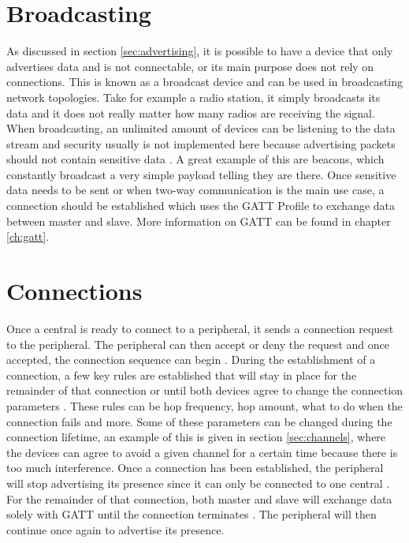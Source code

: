 \documentclass[pdftex,a4paper,12pt,twoside]{report}
\begin{document}
\section{Broadcasting}
\label{sec:broadcasting}
As discussed in section \ref{sec:advertising}, it is possible to have a device that only advertises data and is not connectable, or its main purpose does not rely on connections. This is known as a broadcast device and can be used in broadcasting network topologies. Take for example a radio station, it simply broadcasts its data and it does not really matter how many radios are receiving the signal. When broadcasting, an unlimited amount of devices can be listening to the data stream and security usually is not implemented here because advertising packets should not contain sensitive data \citep{heydon2012bluetooth}. A great example of this are beacons, which constantly broadcast a very simple payload telling they are there. Once sensitive data needs to be sent or when two-way communication is the main use case, a connection should be established which uses the GATT Profile to exchange data between master and slave. More information on GATT can be found in chapter \ref{ch:gatt}.

\section{Connections}
\label{sec:connections}
Once a central is ready to connect to a peripheral, it sends a connection request to the peripheral. The peripheral can then accept or deny the request and once accepted, the connection sequence can begin \citep{heydon2012bluetooth}. During the establishment of a connection, a few key rules are established that will stay in place for the remainder of that connection or until both devices agree to change the connection parameters \citep{bluetooth2014bluetooth}. These rules can be hop frequency, hop amount, what to do when the connection fails and more. Some of these parameters can be changed during the connection lifetime, an example of this is given in section \ref{sec:channels}, where the devices can agree to avoid a given channel for a certain time because there is too much interference. Once a connection has been established, the peripheral will stop advertising its presence since it can only be connected to one central \citep{Townsend2014}. For the remainder of that connection, both master and slave will exchange data solely with GATT until the connection terminates \citep{heydon2012bluetooth}. The peripheral will then continue once again to advertise its presence.
\end{document}
